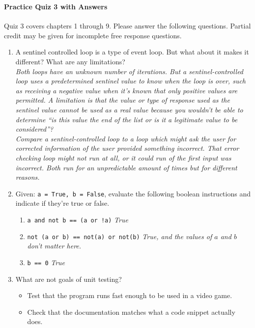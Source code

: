 \documentclass[letter,10pt]{article}
\newcommand*\tick{\item[\Checkmark]}
\begin{document}
\huge
\textbf{Practice Quiz 3 with Answers}
\normalsize

\paragraph{}Quiz 3 covers chapters 1 through 9. Please answer the following questions. Partial credit may be given for incomplete free response questions.

\begin{enumerate}
    \item A sentinel controlled loop is a type of event loop. But what about it makes it different? What are any limitations? \\
    \textit{Both loops have an unknown number of iterations. But a sentinel-controlled loop uses a predetermined sentinel value to know when the loop is over, such as receiving a negative value when it's known that only positive values are permitted. A limitation is that the value or type of response used as the sentinel value cannot be used as a real value because you wouldn't be able to determine ``is this value the end of the list or is it a legitimate value to be considered''?} \\
    \textit{Compare a sentinel-controlled loop to a loop which might ask the user for corrected information of the user provided something incorrect. That error checking loop might not run at all, or it could run of the first input was incorrect. Both run for an unpredictable amount of times but for different reasons.}

    \item Given: \verb|a = True, b = False|, evaluate the following boolean instructions and indicate if they're true or false.
    \begin{enumerate}
        \item \verb|a and not b == (a or !a)| \textit{True}
        \item \verb|not (a or b) == not(a) or not(b)| \textit{True, and the values of $a$ and $b$ don't matter here.}
        \item \verb|b == 0| \textit{True}
    \end{enumerate}

    \item What are not goals of unit testing?
    \begin{itemize}
        \tick Test that the program runs fast enough to be used in a video game.
        \tick Check that the documentation matches what a code snippet actually does.
    \end{itemize}


\end{enumerate}
\end{document}
